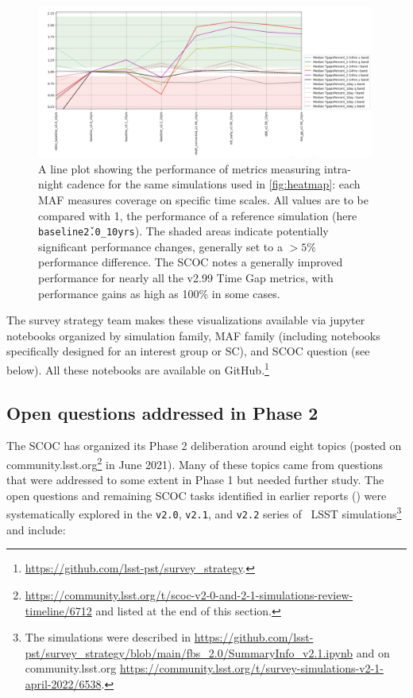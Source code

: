\begin{figure}[h!]
\centering
\includegraphics[width=0.99\textwidth]{figures/SCOC299lines.png}
\caption{A line plot showing the performance of metrics measuring intra-night cadence for the same simulations used in \autoref{fig:heatmap}: each MAF measures coverage on specific time scales. All values are to be compared with 1, the performance of a reference simulation (here \texttt{baseline\v2.0\_10yrs}). The shaded areas indicate potentially significant performance changes, generally set to a $>5\%$ performance difference. The SCOC notes a generally improved performance for nearly all the v2.99 Time Gap metrics, with performance gains as high as 100\% in some cases.}
\label{fig:lineplot}
\end{figure}

\FloatBarrier
The survey strategy team makes these visualizations available via jupyter notebooks organized by simulation family, MAF family (including notebooks specifically designed for an interest group or SC), and SCOC question (see below). All these notebooks are available on GitHub.\footnote{\url{https://github.com/lsst-pst/survey_strategy}.}



\subsection{Open questions addressed in Phase 2}\label{sec:synopsis}

The SCOC has organized its Phase 2 deliberation around eight topics (posted on community.lsst.org\footnote{\url{https://community.lsst.org/t/scoc-v2-0-and-2-1-simulations-review-timeline/6712} and listed at the end of this section.} in June 2021). Many of these topics came from questions that were addressed to some extent in Phase 1 but needed further study. The open questions and remaining SCOC tasks identified in earlier reports () were systematically explored in the \texttt{v2.0}, \texttt{v2.1}, and \texttt{v2.2} series of \opsim\ LSST simulations\footnote{The simulations were described in \url{https://github.com/lsst-pst/survey_strategy/blob/main/fbs_2.0/SummaryInfo_v2.1.ipynb} and on community.lsst.org \url{https://community.lsst.org/t/survey-simulations-v2-1-april-2022/6538}.} and include:

